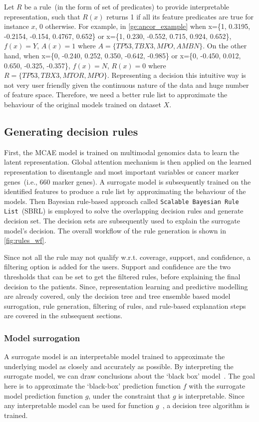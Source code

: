 \hspace*{3.5mm} Let $R$ be a rule~(in the form of set of predicates) to provide interpretable representation, such that $R(x)$ returns 1 if all its feature predicates are true for instance $x$, 0 otherwise. For example, in \cref{ge:ancor_example} when x=\{1, 0.3195, -0.2154, -0.154, 0.4767, 0.652\} or x=\{1, 0.230, -0.552, 0.715, 0.924, 0.652\}, $f(x)=Y$, $A(x)=1$ where $A=\{TP53, TBX3, MPO, AMBN\}$. On the other hand, when x=\{0, -0.240, 0.252, 0.350, -0.642, -0.985\} or x=\{0, -0.450, 0.012, 0.650, -0.325, -0.357\}, $f(x)=N$, $R(x)=0$ where $R=\{TP53, TBX3, MTOR, MPO\}$. Representing a decision this intuitive way is not very user friendly given the continuous nature of the data and huge number of feature space. Therefore, we need a better rule list to approximate the behaviour of the original models trained on dataset $X$. 

\subsection{Generating decision rules}
First, the MCAE model is trained on multimodal genomics data to learn the latent representation. Global attention mechanism is then applied on the learned representation to disentangle and most important variables or cancer marker genes~(i.e., 660 marker genes). A surrogate model is subsequently trained on the identified features to produce a rule list by approximating the behaviour of the  models. Then Bayesian rule-based approach called \texttt{Scalable Bayesian Rule List}~(SBRL) is employed to solve the overlapping decision rules and generate decision set. The decision sets are subsequently used to explain the surrogate model's decision. The overall workflow of the rule generation is shown in \cref{fig:rules_wf}.

\hspace*{3.5mm} Since not all the rule may not qualify w.r.t. coverage, support, and confidence, a filtering option is added for the users. Support and confidence are the two thresholds that can be set to get the filtered rules, before explaining the final decision to the patients. Since, representation learning and predictive modelling are already covered, only the decision tree and tree ensemble based model surrogation, rule generation, filtering of rules, and rule-based explanation steps are covered in the subsequent sections. 

\subsubsection{Model surrogation}
A surrogate model is an interpretable model trained to approximate the underlying model as closely and accurately as possible. By interpreting the surrogate model, we can draw conclusions about the `black box' model~\cite{molnar2019interpretable}. The goal here is to approximate the `black-box' prediction function $f$ with the surrogate model prediction function $g$, under the constraint that $g$ is interpretable. Since any interpretable model can be used for function $g$~\cite{molnar2019interpretable}, a decision tree algorithm is trained. 

